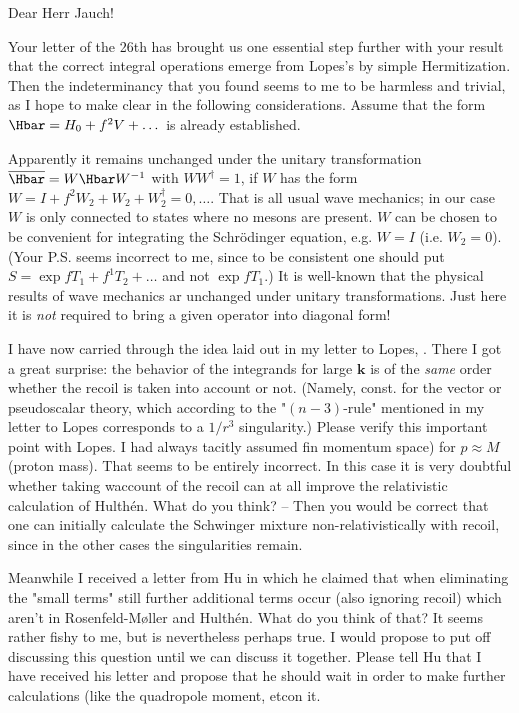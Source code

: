 \date{August 29, 1944}

Dear Herr Jauch!

Your letter of the 26th has brought us one essential step further with your result that the correct integral operations emerge from Lopes's by simple Hermitization. Then the indeterminancy that you found seems to me to be harmless and trivial, as I hope to make clear in the following considerations. Assume that the form $\Hbar = H_0 + f^2 V + \dots$ is already established.

Apparently it remains unchanged under the unitary transformation $\overline{\Hbar} = W\Hbar W^{-1}$ with $W W^\dagger = 1$, if $W$ has the form $W = I + f^2 W_2 + W_2 + W_2^\dagger = 0, \dots$. That is all usual wave mechanics; in our case $W$ is only connected to states where no mesons are present. $W$ can be chosen to be convenient for integrating the Schr\"odinger equation, e.g. $W=I$ (i.e. $W_2=0$). (Your P.S. seems incorrect to me, since to be consistent one should put $S=\exp{fT_1 + f^1T_2 + \dots}$ and not $\exp{fT_1}$.) It is well-known that the physical results of wave mechanics ar unchanged under unitary transformations. Just here it is \textit{not} required to bring a given operator into diagonal form!

I have now carried through the idea laid out in my letter to Lopes, . There I got a great surprise: the behavior of the integrands for large $\mathbf{k}$ is of the \textit{same} order whether the recoil is taken into account or not. (Namely, const. for the vector or pseudoscalar theory, which according to the "$(n-3)$-rule" mentioned in my letter to Lopes corresponds to a $1/r^3$ singularity.) Please verify this important point with Lopes. I had always tacitly assumed  fin momentum space) for $p \approx M$ (proton mass). That seems to be entirely incorrect. In this case it is very doubtful whether taking waccount of the recoil can at all improve the relativistic calculation of Hulth\'en. What do you think? -- Then you would be correct that one can initially calculate the Schwinger mixture non-relativistically with recoil, since in the other cases the singularities remain.

Meanwhile I received a letter from Hu in which he claimed that when eliminating the "small terms" still further additional terms occur (also ignoring recoil) which aren't in Rosenfeld-Møller and Hulth\'en. What do you think of that? It seems rather fishy to me, but is nevertheless perhaps true. I would propose to put off discussing this question until we can discuss it together. Please tell Hu that I have received his letter and propose that he should wait in order to make further calculations (like the quadropole moment, etcon it.



